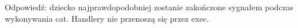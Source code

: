 Odpowiedź: dziecko najprawdopodobniej zostanie zakończone sygnałem podczas wykonywania cat. Handlery nie przenoszą się przez exec.
